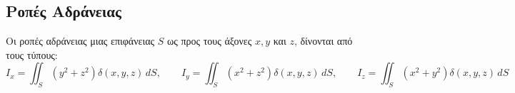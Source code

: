 \subsection*{Ροπές Αδράνειας}

Οι ροπές αδράνειας μιας επιφάνειας $S$ ως προς τους άξονες $ x,y $ και $z$, δίνονται 
από τους τύπους:
\[
  I_{x} = \iint_{S} (y^{2}+z^{2}) \delta (x,y,z)\,{dS}, \qquad
  I_{y} = \iint_{S} (x^{2}+z^{2}) \delta (x,y,z)\,{dS}, \qquad
  I_{z} = \iint_{S} (x^{2}+y^{2}) \delta (x,y,z)\,{dS}
 \] 










